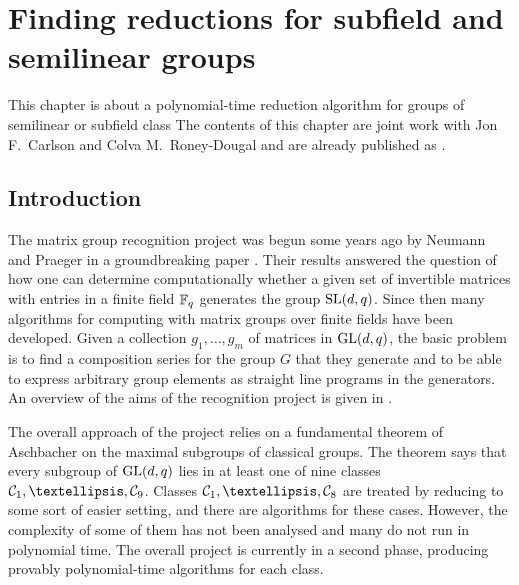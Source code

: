 
\chapter{Finding reductions for subfield and semilinear groups}
\label{chap:subsemi}

This chapter is about a polynomial-time reduction algorithm 
for groups of semilinear or subfield class
The contents of this
chapter are joint work with Jon F.~Carlson and Colva M.~Roney-Dougal and 
are already published as \cite{subfieldpaper}.



\section{Introduction}\label{sec:intro}

The matrix group recognition project was begun some years ago 
by Neumann and Praeger in a groundbreaking paper
\cite{neumann-praeger}. Their results answered the question of how 
one can determine computationally whether a given set 
of invertible matrices with entries in a finite 
field $\mathbb{F}_q$ generates the group $\SL(d,q)$. 
Since then many algorithms for computing with matrix groups 
over finite fields have been developed. Given a collection 
$g_1, \ldots, g_m$ of  matrices in $\GL(d, q)$, the 
basic problem is to find a composition series for the 
group $G$ that they generate and to be able to express arbitrary 
group elements as straight line programs in the generators.  
An overview of the  aims of the recognition 
project  is given in \cite{crlg}.

The overall approach of  the project relies on a fundamental 
theorem of Aschbacher \cite{aschbacher} on the maximal
subgroups of classical groups. The theorem says that every subgroup of
$\GL(d,q)$ lies in at least one of nine classes $\CC1, \ldots, \CC9$.
Classes $\CC1, \ldots, \CC8$ are treated by reducing to 
some sort of easier setting, and there are algorithms  
for these cases. However, the
complexity of some of them has not been analysed and many
do not run in polynomial time. The overall project is currently in a 
second phase, producing provably polynomial-time algorithms for
each class. 

